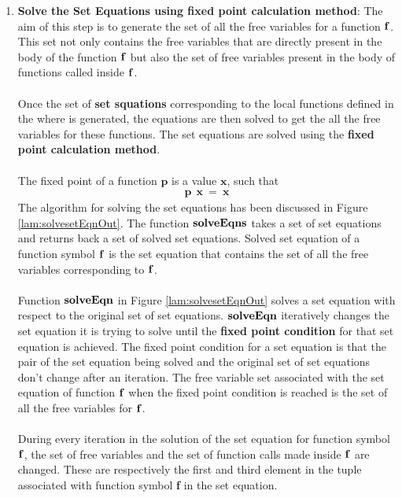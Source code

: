 \documentclass[11pt]{article}
\begin{document}
\begin{enumerate}
    \item {\bf Solve the Set Equations using fixed point calculation method}: The aim of this step is to generate the set of all the free variables for a function ${\bf f}$. This set not only contains the free variables that are directly present in the body of the function ${\bf f}$ but also the set of free variables present in the body of functions called inside ${\bf f}$.
    ~~\\~~\\
    Once the set of {\bf set squations} corresponding to the local functions defined in the {\sf where} is generated, the equations are then solved to get the all the free variables for these functions. The set equations are solved using the {\bf fixed point calculation method}.
    ~~\\~~\\ 
    The fixed point of a function $\mathbf{p}$ is a value $\mathbf{x}$, such that
    \begin{align*}
    \mathbf{p~~x~=~x}
    \end{align*}
    The algorithm for solving the set equations has been discussed in Figure \ref {lam:solvesetEqnOut}. 
    The function ${\bf solveEqns}$ takes a set of set equations and returns back a set of solved set equations. Solved set equation of a function symbol ${\bf f}$ is the set equation that contains the set of all the free variables corresponding to ${\bf f}$.
    ~~\\~~\\ 
    Function ${\bf solveEqn}$ in Figure  \ref {lam:solvesetEqnOut} solves a set equation with respect to the original set of set equations. ${\bf solveEqn}$ iteratively changes the set equation it is trying to solve until the {\bf fixed point condition} for that set equation is achieved. The fixed point condition for a set equation is that the pair of the set equation being solved and the original set of set equations don't change after an iteration. The free variable set associated with the set equation of function ${\bf f}$ when the fixed point condition is reached is the set of all the free variables for ${\bf f}$.
    ~~\\~~\\
    During every iteration in the solution of the set equation for function symbol ${\bf f}$, the set of free variables and the set of function calls made inside ${\bf f}$ are changed. These are respectively the first and third element in the tuple associated with function symbol {\bf f} in the set equation.
    ~~\\~~\\

\end{enumerate}
\end{document}

